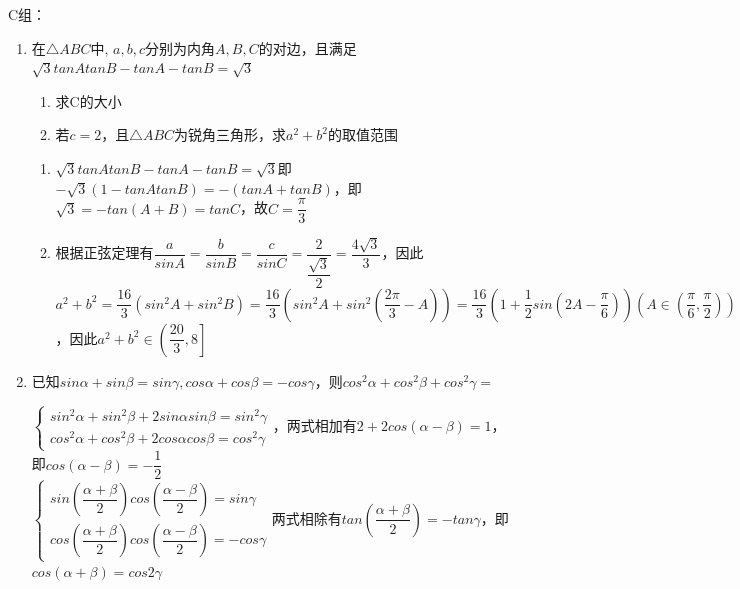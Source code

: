C组：
\begin{enumerate}
    \item 在$\triangle{ABC}$中, $a,b,c$分别为内角$A,B,C$的对边，且满足$\sqrt{3}tanAtanB - tanA - tanB = \sqrt{3}$
    \begin{enumerate}
        \item 求C的大小
        \item 若$c = 2$，且$\triangle{ABC}$为锐角三角形，求$a^2+b^2$的取值范围
    \end{enumerate}
    \begin{jieda}
        \begin{enumerate}
            \item $\sqrt{3}tanAtanB - tanA - tanB = \sqrt{3}$即$-\sqrt{3}(1-tanAtanB) = -(tanA + tanB)$，即$\sqrt{3} = -tan(A+B) = tanC$，故$C = \dfrac{\pi}{3}$
            \item 根据正弦定理有$\dfrac{a}{sinA} = \dfrac{b}{sinB} = \dfrac{c}{sinC} = \dfrac{2}{\dfrac{\sqrt{3}}{2}} = \dfrac{4\sqrt{3}}{3}$，因此$a^2+b^2 = \dfrac{16}{3}(sin^2A + sin^2B) = \dfrac{16}{3}(sin^2A + sin^2(\dfrac{2\pi}{3}-A)) = \dfrac{16}{3}(1+\dfrac{1}{2}sin(2A - \dfrac{\pi}{6}))(A \in (\dfrac{\pi}{6}, \dfrac{\pi}{2}))$，因此$a^2+b^2 \in \left(\dfrac{20}{3}, 8 \right]$
        \end{enumerate}        
    \end{jieda}
    \item 已知$sin\alpha + sin\beta = sin\gamma, cos\alpha + cos\beta = -cos\gamma$，则$cos^2\alpha + cos^2\beta + cos^2\gamma = $
    \begin{jieda}
        $\left \{ \begin{array}{l}
             sin^2\alpha + sin^2\beta + 2sin\alpha sin\beta = sin^2\gamma \\
             cos^2\alpha + cos^2\beta + 2cos\alpha cos\beta = cos^2\gamma
        \end{array}\right.$，两式相加有$2 + 2cos(\alpha - \beta) = 1$，即$cos(\alpha - \beta) = -\dfrac{1}{2}$ \\
        $\left \{ \begin{array}{l}
             sin\left(\dfrac{\alpha+\beta}{2}\right)cos\left(\dfrac{\alpha-\beta}{2}\right) = sin\gamma \\
             cos\left(\dfrac{\alpha+\beta}{2}\right)cos\left(\dfrac{\alpha-\beta}{2}\right) = -cos\gamma
        \end{array}\right.$两式相除有$tan\left(\dfrac{\alpha+\beta}{2}\right) = -tan\gamma$，即$cos(\alpha+\beta) = cos2\gamma$ \\

\end{jieda}
\end{enumerate}
